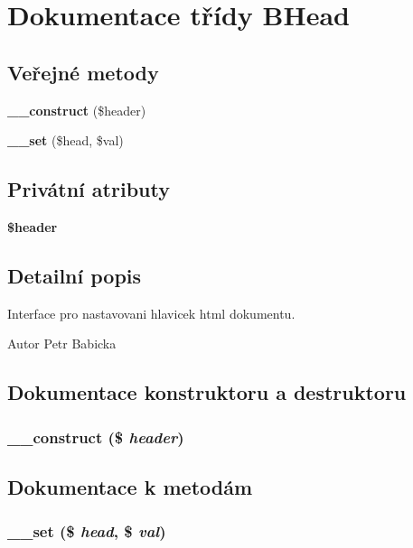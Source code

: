 \section{Dokumentace třídy BHead}
\label{d5/d9e/class_b_head}
\subsection*{Veřejné metody}
\begin{DoxyCompactItemize}
\item 
{\bf \_\-\_\-construct} (\$header)
\item 
{\bf \_\-\_\-set} (\$head, \$val)
\end{DoxyCompactItemize}
\subsection*{Privátní atributy}
\begin{DoxyCompactItemize}
\item 
{\bf \$header}
\end{DoxyCompactItemize}


\subsection{Detailní popis}
Interface pro nastavovani hlavicek html dokumentu. \begin{DoxyAuthor}{Autor}
Petr Babicka 
\end{DoxyAuthor}


\subsection{Dokumentace konstruktoru a destruktoru}
\subsubsection[{\_\-\_\-construct}]{\setlength{\rightskip}{0pt plus 5cm}\_\-\_\-construct (\$ {\em header})}\label{d5/d9e/class_b_head_aedf929df290930085e0684fb961566f0}


\subsection{Dokumentace k metodám}
\subsubsection[{\_\-\_\-set}]{\setlength{\rightskip}{0pt plus 5cm}\_\-\_\-set (\$ {\em head}, \/  \$ {\em val})}\label{d5/d9e/class_b_head_ae63ba34e4d927b840ad722519cc8f071}



